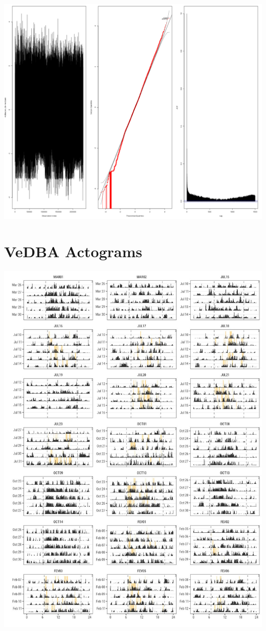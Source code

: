 \documentclass[english,msc,numbers,hidelinks]{coppe}
\begin{document}
  \begin{center}\includegraphics[width=1\linewidth]{../04_figures/residuals/m2_PR} \end{center}

  \hypertarget{vedba-actograms}{%
  \chapter{VeDBA Actograms}\label{vedba-actograms}}
  \begin{center}\includegraphics[width=0.95\linewidth]{../04_figures/actograms/actograms_vedba} \end{center}
\end{document}
